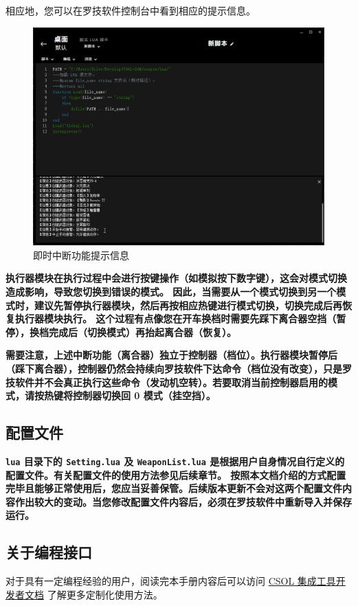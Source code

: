 相应地，您可以在罗技软件控制台中看到相应的提示信息。

\begin{figure}[H]
    \Centering
    \includegraphics[width=\textwidth]{assets/intro/interrupt.png}
    \caption{即时中断功能提示信息}
\end{figure}

\textbf{\color{red}执行器模块在执行过程中会进行按键操作（如模拟按下数字键），这会对模式切换造成影响，导致您切换到错误的模式。
因此，当需要从一个模式切换到另一个模式时，建议先暂停执行器模块，然后再按相应热键进行模式切换，切换完成后再恢复执行器模块执行。
这个过程有点像您在开车换档时需要先踩下离合器空挡（暂停），换档完成后（切换模式）再抬起离合器（恢复）。}

\textbf{\color{red}需要注意，上述中断功能（离合器）独立于控制器（档位）。执行器模块暂停后（踩下离合器），控制器仍然会持续向罗技软件下达命令（档位没有改变），只是罗技软件并不会真正执行这些命令（发动机空转）。若要取消当前控制器启用的模式，请按热键将控制器切换回 0 模式（挂空挡）。}

\subsection{配置文件}

\textbf{\color{red}\lstinline{lua} 目录下的 \lstinline{Setting.lua} 及 \lstinline{WeaponList.lua} 是根据用户自身情况自行定义的配置文件。有关配置文件的使用方法参见后续章节。
按照本文档介绍的方式配置完毕且能够正常使用后，您应当妥善保管。后续版本更新不会对这两个配置文件内容作出较大的变动。当您修改配置文件内容后，必须在罗技软件中重新导入并保存运行。}

\subsection{关于编程接口}

对于具有一定编程经验的用户，阅读完本手册内容后可以访问 \href{https://blog.macrohard.fun/CSOL-Utilities/}{CSOL 集成工具开发者文档} 了解更多定制化使用方法。
